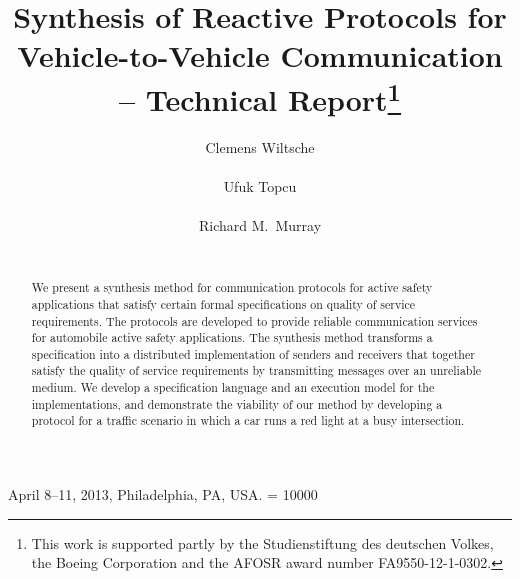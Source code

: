 \documentclass{sig-alternate}
\begin{document}
 {April 8--11, 2013, Philadelphia, PA, USA.} 
\widowpenalty = 10000

\title{Synthesis of Reactive Protocols for Vehicle-to-Vehicle Communication -- Technical Report\thanks{This work is supported partly by the Studienstiftung des deutschen Volkes, the Boeing Corporation and the AFOSR award number FA9550-12-1-0302.}}


\author{
\alignauthor
Clemens Wiltsche\vspace{0.05in} \\
       \\[1\jot]
\alignauthor
Ufuk Topcu\vspace{0.05in} \\
       \\[1\jot]
\alignauthor
Richard M.\ Murray\vspace{0.05in} \\
       \\[1\jot]
}

\maketitle

\begin{abstract}
We present a synthesis method for communication protocols for active safety applications that satisfy certain formal specifications on quality of service requirements. The protocols are developed to provide reliable communication services for automobile active safety applications. The synthesis method transforms a specification into a distributed implementation of senders and receivers that together satisfy the quality of service requirements by transmitting messages over an unreliable medium. We develop a specification language and an execution model for the implementations, and demonstrate the viability of our method by developing a protocol for a traffic scenario in which a car runs a red light at a busy intersection.
\end{abstract}

\end{document}
